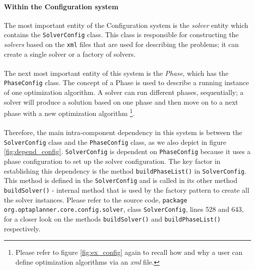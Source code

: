 \paragraph{Within the Configuration system} 
The most important entity of the Configuration system is the \textit{solver} entity which contains the \verb!SolverConfig! class. This class is responsible for constructing the \textit{solvers} based on the \verb!xml! files that are used for describing the problems; it can create a single solver or a factory of solvers. \\\\
The next most important entity of this system is the \textit{Phase}, which has the \verb!PhaseConfig! class. The concept of a Phase is used to describe a running instance of one optimization algorithm. A solver can run different phases, sequentially; a solver will produce a solution based on one phase and then move on to a next phase with a new optimization algorithm \footnote{Please refer to figure \ref{fig:ex_config} again to recall how and why a user can define optimization algorithms via an \textit{xml} file.}. \\\\
Therefore, the main intra-component dependency in this system is between the \verb!SolverConfig! class and the \verb!PhaseConfig! class, as we also depict in figure \ref{fig:depend_config}. \verb!SolverConfig! is dependent on \verb!PhaseConfig! because it uses a phase configuration to set up the solver configuration.
The key factor in establishing this dependency is the method \verb!buildPhaseList()! in \verb!SolverConfig!. This method is defined in the \verb!SolverConfig! and is called in its other method \verb!buildSolver()! - internal method that is used by the factory pattern to create all the solver instances. Please refer to the source code, \verb!package org.optaplanner.core.config.solver!, class \verb!SolverConfig!, lines 528 and 643, for a closer look on the methods \verb!buildSolver()! and \verb!buildPhaseList()! respectively.

